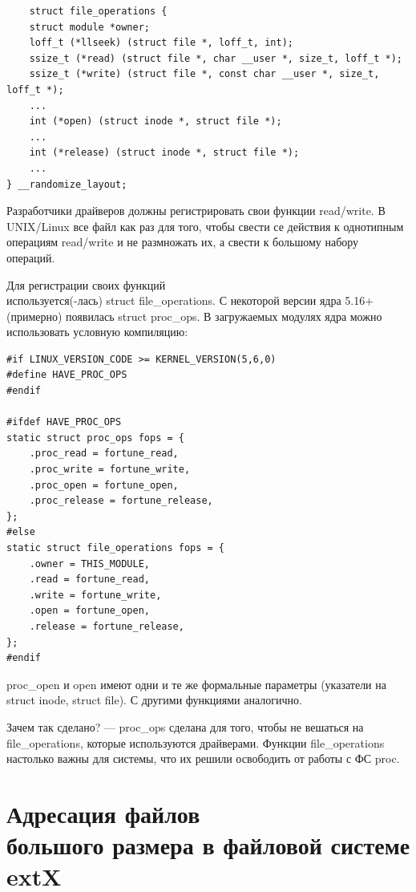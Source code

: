 \begin{lstlisting}
	struct file_operations {
	struct module *owner;
	loff_t (*llseek) (struct file *, loff_t, int);
	ssize_t (*read) (struct file *, char __user *, size_t, loff_t *);
	ssize_t (*write) (struct file *, const char __user *, size_t, loff_t *);
	...
	int (*open) (struct inode *, struct file *);
	...
	int (*release) (struct inode *, struct file *);
	...
} __randomize_layout;
\end{lstlisting}

Разработчики драйверов должны регистрировать свои функции read/write. В UNIX/Linux все файл как раз для того, чтобы свести се действия к однотипным операциям read/write и не размножать их, а свести к большому набору операций.

Для регистрации своих функций \\ используется(-лась) struct file\_operations. С некоторой версии ядра 5.16+ (примерно) появилась struct proc\_ops. В загружаемых модулях ядра можно использовать условную компиляцию:

\begin{lstlisting}
#if LINUX_VERSION_CODE >= KERNEL_VERSION(5,6,0)
#define HAVE_PROC_OPS
#endif

#ifdef HAVE_PROC_OPS
static struct proc_ops fops = {
    .proc_read = fortune_read,
    .proc_write = fortune_write,
    .proc_open = fortune_open,
    .proc_release = fortune_release,
};
#else
static struct file_operations fops = {
    .owner = THIS_MODULE,
    .read = fortune_read,
    .write = fortune_write,
    .open = fortune_open,
    .release = fortune_release,
};
#endif
\end{lstlisting}

proc\_open и open имеют одни и те же формальные параметры (указатели на struct inode, struct file). С другими функциями аналогично.

Зачем так сделано? --- proc\_ops сделана для того, чтобы не вешаться на \\ file\_operations, которые используются драйверами. Функции file\_operations настолько важны для системы, что их решили освободить от работы с ФС proc.

\section{Адресация файлов \\ большого размера в файловой системе extX}

